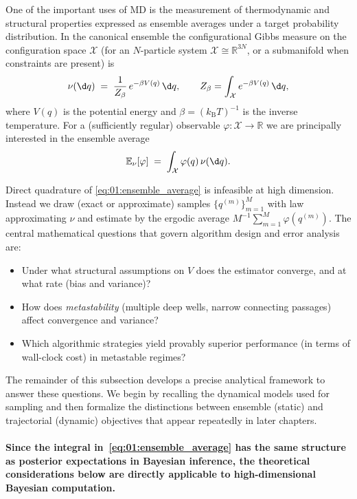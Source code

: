 One of the important uses of MD is the measurement of thermodynamic and structural properties expressed as ensemble averages
under a target probability distribution. In the canonical ensemble the configurational Gibbs measure on the configuration space
$\mathcal X$ (for an $N$-particle system $\mathcal X\cong\mathbb R^{3N}$, or a submanifold when constraints are present) is
\begin{equation}\label{eq:01:gibbs}
    \nu(\d q) \;=\; \frac{1}{Z_\beta}\, e^{-\beta V(q)}\,\d q,\qquad
    Z_\beta=\int_{\mathcal X} e^{-\beta V(q)}\,\d q,
\end{equation}
where $V(q)$ is the potential energy and $\beta=(k_{\mathrm B}T)^{-1}$ is the inverse temperature. For a (sufficiently regular)
observable $\varphi:\mathcal X\to\mathbb R$ we are principally interested in the ensemble average
\begin{equation}\label{eq:01:ensemble_average}
    \mathbb E_{\nu}[\varphi] \;=\; \int_{\mathcal X}\varphi(q)\,\nu(\d q).
\end{equation}

\noindent Direct quadrature of \eqref{eq:01:ensemble_average} is infeasible at high dimension. Instead we draw (exact or approximate)
samples $\{q^{(m)}\}_{m=1}^M$ with law approximating $\nu$ and estimate by the ergodic average $M^{-1}\sum_{m=1}^M\varphi(q^{(m)})$.
The central mathematical questions that govern algorithm design and error analysis are:
\begin{itemize}
    \item Under what structural assumptions on $V$ does the estimator converge, and at what rate (bias and variance)?
    \item How does \emph{metastability} (multiple deep wells, narrow connecting passages) affect convergence and variance?
    \item Which algorithmic strategies yield provably superior performance (in terms of wall-clock cost) in metastable regimes?
\end{itemize}

The remainder of this subsection develops a precise analytical framework to answer these questions. We begin by recalling the
dynamical models used for sampling and then formalize the distinctions between ensemble (static) and trajectorial (dynamic)
objectives that appear repeatedly in later chapters.

\paragraph{Since the integral in~\eqref{eq:01:ensemble_average} has the same structure as posterior expectations in Bayesian inference, the theoretical considerations below are directly applicable to high-dimensional Bayesian computation.}

